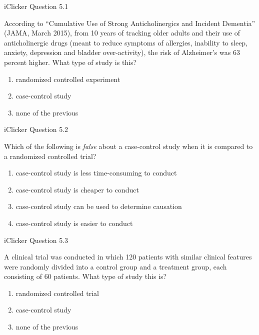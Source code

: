 \documentclass[14pt]{beamer}\usepackage[]{graphicx}\usepackage[]{color}
\begin{document}
\begin{frame}[fragile]{iClicker Question 5.1}

According to ``Cumulative Use of Strong Anticholinergics and Incident  Dementia'' (JAMA, March 2015), from 10 years of tracking older adults  and their use of anticholinergic drugs (meant to reduce symptoms of  allergies, inability to sleep, anxiety, depression and bladder over-activity), the risk of Alzheimer's was 63 percent higher. What type  of study is this?

\begin{enumerate}
  \item randomized controlled experiment
  \item case-control study
  \item none of the previous
\end{enumerate}
\end{frame}

\begin{frame}[fragile]{iClicker Question 5.2}

Which of the following is \textit{false} about a case-control study when it is  compared to a randomized controlled trial?

\begin{enumerate}
  \item case-control study is less time-consuming to conduct
  \item case-control study is cheaper to conduct
  \item case-control study can be used to determine causation
  \item case-control study is easier to conduct
\end{enumerate}
\end{frame}

\begin{frame}[fragile]{iClicker Question 5.3}

A clinical trial was conducted in which 120 patients with similar clinical  features were randomly divided into a control group and a treatment  group, each consisting of 60 patients. What type of study this is?

\begin{enumerate}
  \item randomized controlled trial
  \item case-control study
  \item none of the previous
\end{enumerate}
\end{frame}
\end{document}
